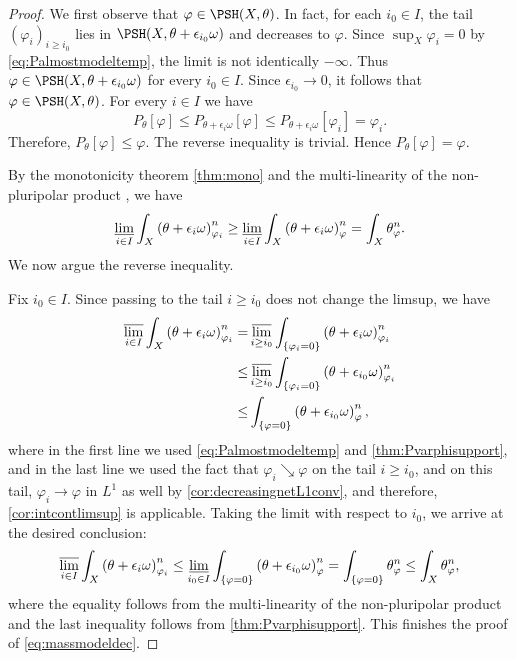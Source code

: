 \begin{proof}
        We first observe that $\varphi\in \PSH(X,\theta)$. In fact, for each $i_0\in I$, the tail $(\varphi_i)_{i\geq i_0}$ lies in $\PSH(X,\theta+\epsilon_{i_0}\omega)$ and decreases to $\varphi$. Since $\sup_X\varphi_i=0$ by \eqref{eq:Palmostmodeltemp}, the limit is not identically $-\infty$. Thus $\varphi\in \PSH(X,\theta+\epsilon_{i_0}\omega)$ for every $i_0\in I$. Since $\epsilon_{i_0}\to 0$, it follows that $\varphi\in \PSH(X,\theta)$.
        For every $i\in I$ we have
        \[
        P_{\theta}[\varphi]\leq P_{\theta+\epsilon_i\omega}[\varphi]\leq P_{\theta+\epsilon_i\omega}[\varphi_i]=\varphi_i.
        \]
        Therefore, $P_{\theta}[\varphi]\leq \varphi$. The reverse inequality is trivial. Hence $P_{\theta}[\varphi]=\varphi$.

        By the monotonicity theorem \cref{thm:mono} and the multi-linearity of the non-pluripolar product , we have
        \[
            \varliminf_{i\in I} \int_X \left(\theta + \epsilon_i \omega\right)^n_{\varphi_i} \geq  \varliminf_{i\in I} \int_X \left(\theta + \epsilon_i \omega\right)^n_{\varphi}  = \int_X \theta_{\varphi}^n.
        \]
        We now argue the reverse inequality.

        Fix $i_0\in I$. Since passing to the tail $i\geq i_0$ does not change the limsup, we have
        \[
            \begin{aligned}
                \varlimsup_{i\in I} \int_X \left(\theta + \epsilon_i \omega\right)^n_{\varphi_i}=&\varlimsup_{i\geq i_0} \int_{\left\{\varphi_i =0\right\}} \left(\theta + \epsilon_i \omega\right)^n_{\varphi_i} \\
                \leq & \varlimsup_{i\geq i_0} \int_{\left\{\varphi_i =0\right\}} \left(\theta + \epsilon_{i_0} \omega\right)^n_{\varphi_i}\\
                \leq & \int_{\left\{\varphi =0\right\}} \left(\theta + \epsilon_{i_0} \omega\right)^n_{\varphi},
            \end{aligned}
        \]
    where in the first line we used \eqref{eq:Palmostmodeltemp} and \cref{thm:Pvarphisupport}, and in the last line we used the fact that $\varphi_i \searrow \varphi$ on the tail $i\geq i_0$, and on this tail, $\varphi_i \to \varphi$ in $L^1$ as well by \cref{cor:decreasingnetL1conv}, and therefore, \cref{cor:intcontlimsup} is applicable. Taking the limit with respect to $i_0$, we arrive at the desired conclusion:
    \[
    \varlimsup_{i\in I} \int_{X} \left(\theta + \epsilon_i \omega \right)^n_{\varphi_i} \leq \varliminf_{i_0\in I}\int_{\{\varphi =0\}} \left(\theta + \epsilon_{i_0} \omega \right)^n_{\varphi}  =  \int_{\{\varphi =0\}} \theta^n_{\varphi} \leq \int_{X} \theta^n_{\varphi},
    \]
    where the equality follows from the multi-linearity of the non-pluripolar product  and the last inequality follows from \cref{thm:Pvarphisupport}.
    This finishes the proof of \eqref{eq:massmodeldec}.


\end{proof}

